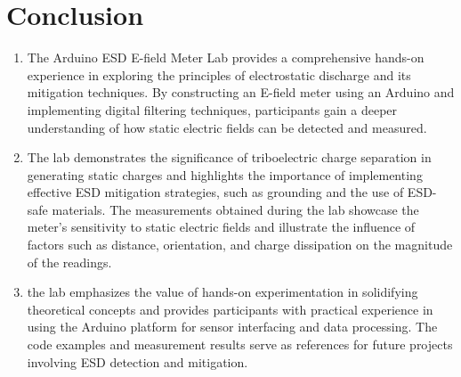 \documentclass[a4paper,11pt]{article}%
\begin{document}
\section{Conclusion}
\begin{enumerate}
  \item The Arduino ESD E-field Meter Lab provides a comprehensive hands-on experience in exploring the principles of electrostatic discharge and its mitigation techniques. By constructing an E-field meter using an Arduino and implementing digital filtering techniques, participants gain a deeper understanding of how static electric fields can be detected and measured.
  \item The lab demonstrates the significance of triboelectric charge separation in generating static charges and highlights the importance of implementing effective ESD mitigation strategies, such as grounding and the use of ESD-safe materials. The measurements obtained during the lab showcase the meter's sensitivity to static electric fields and illustrate the influence of factors such as distance, orientation, and charge dissipation on the magnitude of the readings.
  \item the lab emphasizes the value of hands-on experimentation in solidifying theoretical concepts and provides participants with practical experience in using the Arduino platform for sensor interfacing and data processing. The code examples and measurement results serve as references for future projects involving ESD detection and mitigation.
\end{enumerate}
\end{document}
